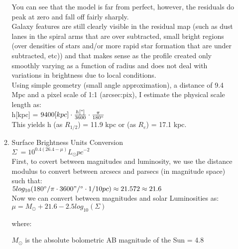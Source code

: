 \documentclass[11pt]{article}
\begin{document}
\begin{enumerate}
\begin{enumerate}
  You can see that the model is far from perfect, however, the residuals do peak at zero and fall off fairly sharply. \\
  
  Galaxy features are still clearly visible in the residual map (such as dust lanes in the spiral arms that are over subtracted, small bright regions (over densities of stars and/or more rapid star formation that are under subtracted, etc)) and that makes sense as the profile created only smoothly varying as a function of radius and does not deal with variations in brightness due to local conditions.\\
  
  Using simple geometry (small angle approximation), a distance of 9.4 Mpc and a pixel scale of 1:1 (arcsec:pix), I estimate the physical scale length as:\\
  
  \hspace{10mm} h[kpc] = $9400 [kpc] \cdot \frac{h["]}{3600} \cdot \frac{\pi}{180^{\circ}}$ \\
  
  This yields h (as $R_{1/2}$) = 11.9 kpc or (as $R_{e}$) = 17.1 kpc.\\
  
  \item Surface Brightness Units Conversion \\%
    
  \hspace{10mm} $\Sigma \ = 10^{0.4(26.4- \mu)} L_{\odot} pc^{-2}$ \\

  First, to covert between magnitudes and luminosity, we use the distance modulus to convert between arcsecs and parsecs (in magnitude space) such that:\\
  
  \hspace{10mm} $5 log_{10}(180^{\circ}/\pi \cdot 3600"/{}^{\circ} \cdot 1/10pc) \approx 21.572 \approx 21.6$ \\
  
  Now we can convert between magnitudes and solar Luminosities as:\\

  \hspace{10mm} $\mu = M_{\odot} + 21.6 - 2.5 log_{10}(\Sigma)$ 
  
  \hspace{10mm} where:
  
  \hspace{20mm} $M_{\odot}$ is the absolute bolometric AB magnitude of the Sun = 4.8
  

\end{enumerate}
\end{enumerate}
\end{document}
